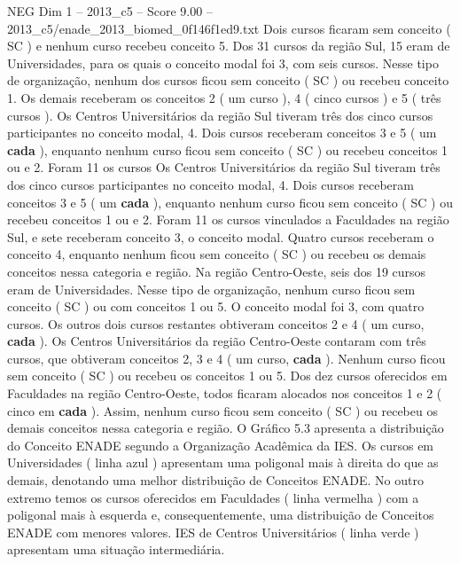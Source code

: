 \begin{textsample}{NEG Dim 1 – 2013\_c5 – Score 9.00 – 2013\_c5/enade\_2013\_biomed\_0f146f1ed9.txt}
Dois cursos ficaram sem conceito ( SC ) e nenhum curso recebeu conceito 5.
Dos 31 cursos da região Sul, 15 eram de Universidades, para os quais o conceito modal foi 3, com seis cursos.
Nesse tipo de organização, nenhum dos cursos ficou sem conceito ( SC ) ou recebeu conceito 1.
Os demais receberam os conceitos 2 ( um curso ), 4 ( cinco cursos ) e 5 ( três cursos ).
Os Centros Universitários da região Sul tiveram três dos cinco cursos participantes no conceito modal, 4.
Dois cursos receberam conceitos 3 e 5 ( um \textbf{cada} ), enquanto nenhum curso ficou sem conceito ( SC ) ou recebeu conceitos 1 ou e 2.
Foram 11 os cursos Os Centros Universitários da região Sul tiveram três dos cinco cursos participantes no conceito modal, 4.
Dois cursos receberam conceitos 3 e 5 ( um \textbf{cada} ), enquanto nenhum curso ficou sem conceito ( SC ) ou recebeu conceitos 1 ou e 2.
Foram 11 os cursos vinculados a Faculdades na região Sul, e sete receberam conceito 3, o conceito modal.
Quatro cursos receberam o conceito 4, enquanto nenhum ficou sem conceito ( SC ) ou recebeu os demais conceitos nessa categoria e região.
Na região Centro-Oeste, seis dos 19 cursos eram de Universidades.
Nesse tipo de organização, nenhum curso ficou sem conceito ( SC ) ou com conceitos 1 ou 5.
O conceito modal foi 3, com quatro cursos.
Os outros dois cursos restantes obtiveram conceitos 2 e 4 ( um curso, \textbf{cada} ).
Os Centros Universitários da região Centro-Oeste contaram com três cursos, que obtiveram conceitos 2, 3 e 4 ( um curso, \textbf{cada} ).
Nenhum curso ficou sem conceito ( SC ) ou recebeu os conceitos 1 ou 5.
Dos dez cursos oferecidos em Faculdades na região Centro-Oeste, todos ficaram alocados nos conceitos 1 e 2 ( cinco em \textbf{cada} ).
Assim, nenhum curso ficou sem conceito ( SC ) ou recebeu os demais conceitos nessa categoria e região.
O Gráfico 5.3 apresenta a distribuição do Conceito ENADE segundo a Organização Acadêmica da IES.
Os cursos em Universidades ( linha azul ) apresentam uma poligonal mais à direita do que as demais, denotando uma melhor distribuição de Conceitos ENADE.
No outro extremo temos os cursos oferecidos em Faculdades ( linha vermelha ) com a poligonal mais à esquerda e, consequentemente, uma distribuição de Conceitos ENADE com menores valores.
IES de Centros Universitários ( linha verde ) apresentam uma situação intermediária.

\end{textsample}
